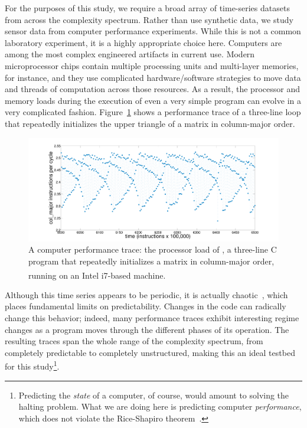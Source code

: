 For the purposes of this study, we require a broad array of
time-series datasets from across the complexity spectrum.  Rather than
use synthetic data, we study sensor data from computer performance
experiments.  While this is not a common laboratory experiment, it is
a highly appropriate choice here.  Computers are among the most
complex engineered artifacts in current use.  Modern microprocessor
chips contain multiple processing units and multi-layer memories, for
instance, and they use complicated hardware/software strategies to
move data and threads of computation across those resources.  As a
result, the processor and memory loads during the execution of even a
very simple program can evolve in a very complicated fashion.
Figure~\ref{fig:col-ipc} shows a performance trace of a three-line
loop that repeatedly initializes the upper triangle of a matrix in
column-major order.
%
 \begin{figure}[htbp]
    \centering
    \includegraphics[width=\columnwidth]{figs/colshortts}
    \caption{A computer performance trace: the processor load of \col,
      a three-line C program that repeatedly initializes a matrix in
      column-major order, running on an Intel
      i7\textsuperscript{\textregistered}-based machine.}
   \label{fig:col-ipc}
  \end{figure}
%
Although this time series appears to be periodic, it is actually
chaotic~\cite{mytkowicz09}, which places fundamental limits on
predictability.  Changes in the code can radically change this
behavior; indeed, many performance traces exhibit interesting regime
changes as a program moves through the different phases of its
operation.  The resulting traces span the whole range of the
complexity spectrum, from completely predictable to completely
unstructured, making this an ideal testbed for this
study\footnote{Predicting the \emph{state} of a computer, of course,
  would amount to solving the halting problem.  What we are doing here
  is predicting computer \emph{performance}, which does not violate
  the Rice-Shapiro theorem~\cite{hopcroft2007}.}.

